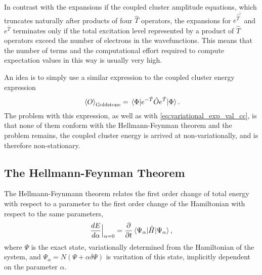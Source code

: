 In contrast with the expansions if the coupled cluster amplitude equations, which 
truncates naturally after products of four $\hat{T}$ operators, the expansions for 
$e^{\hat{\hat{T}}^\dagger}$ and $e^{\hat{T}}$ terminates only if the total excitation 
level represented by a product of $\hat{T}$ operators exceed the number of electrons in 
the wavefunctions. This means that the number of terms and the computational effort
required to compute expectation values in this way is usually very high.

An idea is to simply use a similar expression to the coupled cluster energy
expression
\begin{equation}
    \ev*{O}_{\text{Goldstone}} = \mel{\Phi}{e^{-\hat{T}}\hat{O}e^{\hat{T}}}{\Phi}.
\end{equation}
The problem with this expression, as well as with \autoref{eq:variational_exp_val_cc},
is that none of them conform with the Hellmann-Feynman theorem and the problem remains,
the coupled cluster energy is arrived at non-variationally, and is therefore non-stationary.

\subsection{The Hellmann-Feynman Theorem}

The Hellmann-Feynmann\cite{feynman1939forces} theorem relates the first order change of total energy 
with respect to a parameter to the first order change of the Hamiltonian with 
respect to the same parameters,
\begin{equation}
    \frac{d E}{d\alpha}\Big\lvert_{\alpha=0} = 
    \frac{\partial}{\partial t}\mel{\Psi_\alpha}{\hat{H}}{\Psi_\alpha},
\end{equation}
where $\Psi$ is the exact state, variationally determined from the Hamiltonian of the 
system, and $\Psi_\alpha = N(\Psi + \alpha \delta\Psi)$ is varitation of this state,
implicitly dependent on the parameter $\alpha$.

